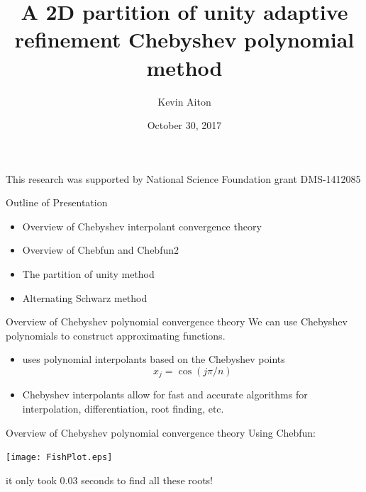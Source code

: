 \documentclass{beamer}
\title[Optimal Domain Splitting]{A 2D partition of unity adaptive refinement Chebyshev polynomial method}
\author[K. Aiton]{Kevin Aiton}
\institute[UD]{
  Department of Mathematics\\
University of Delaware\\
}
\date[October 2016]{October 30, 2017}
\begin{document}
%
%
\begin{frame}[plain]
  \titlepage
  \begin{center}
  This research was supported by National Science Foundation grant DMS-1412085
  \end{center}
\end{frame}

%
%

\begin{frame}[plain]{Outline of Presentation}

\begin{itemize}
	\item Overview of Chebyshev interpolant convergence theory
	\item Overview of Chebfun and Chebfun2
	\item The partition of unity method
	\item Alternating Schwarz method
\end{itemize}
\end{frame}

%
%
\begin{frame}{Overview of Chebyshev polynomial convergence theory}
We can use Chebyshev polynomials to construct approximating functions.
\begin{itemize}
\item {} uses polynomial interpolants based on the Chebyshev points $$x_j = \cos(j\pi/n)$$	
\item Chebyshev interpolants allow for fast and accurate algorithms for
interpolation, differentiation, root finding, etc.
\end{itemize}
\end{frame}

\begin{frame}{Overview of Chebyshev polynomial convergence theory}
Using Chebfun:	
\bigskip

\begin{center}
\texttt{[image: FishPlot.eps]}
\end{center}
\begin{center}
it only took 0.03 seconds to find all these roots!	
\end{center}

\end{frame}
\end{document}
